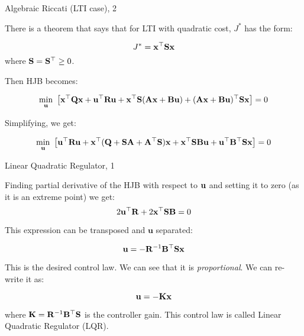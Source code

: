 \documentclass{beamer}
\begin{document}
\begin{frame}{Algebraic Riccati (LTI case), 2}
\begin{flushleft}

There is a theorem that says that for LTI with quadratic cost, $J^*$ has the form:

\begin{equation}
J^* = \mathbf  x^\top \mathbf{S} \mathbf{x}
\end{equation}
%
where $\mathbf{S} = \mathbf{S}^\top \geq 0$.

\bigskip

Then HJB becomes:

\[
\underset{\bo{u}}{\min} \ 
\left [ 
\mathbf  x^\top \bo{Q} \bo{x} +
\mathbf  u^\top \bo{R} \bo{u}
+ 
\bo{x}^\top \bo{S}
(\bo{A} \bo{x} + \bo{B} \bo{u}) 
+ 
(\bo{A} \bo{x} + \bo{B} \bo{u})^\top
\bo{S} \bo{x}
\right ] = 0
\]

Simplifying, we get:

\[
\underset{\bo{u}}{\min} \ 
\left [ 
\bo{u}^\top \bo{R} \bo{u}
+ 
\bo{x}^\top (
\bo{Q} + \bo{S} \bo{A} + \bo{A}^\top \bo{S}
)\bo{x}
+ 
\bo{x}^\top \bo{S} \bo{B} \bo{u} 
+ \bo{u}^\top \bo{B}^\top \bo{S} \bo{x} 
\right ] = 0
\]

\end{flushleft}
\end{frame}


\begin{frame}{Linear Quadratic Regulator, 1}
\begin{flushleft}


Finding partial derivative of the HJB with respect to $\mathbf{u}$ and setting it to zero (as it is an extreme point) we get:
\begin{equation}
2 \mathbf  u^\top \mathbf{R} + 
2 \mathbf{x}^\top \mathbf{S} \mathbf{B} = 0
\end{equation}

This expression can be transposed and $\mathbf  u$ separated:

\begin{equation}
\mathbf  u = 
-\mathbf{R}^{-1} \mathbf{B}^\top \mathbf{S} \mathbf{x}
\end{equation}

This is the desired control law. We can see that it is \emph{proportional}. We can re-write it as:

\begin{equation}
\mathbf  u = -\mathbf K \mathbf{x}
\end{equation}

where $\mathbf K = \mathbf{R}^{-1} \mathbf{B}^\top \mathbf{S}$ is the controller gain. This control law is called Linear Quadratic Regulator (LQR).

\end{flushleft}
\end{frame}
\end{document}
